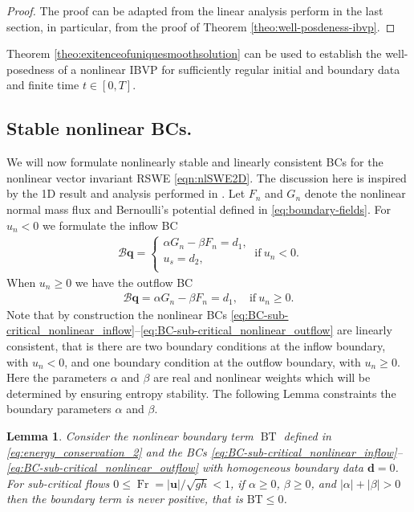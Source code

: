 \documentclass{article}
\numberwithin{equation}{section}
\newtheorem{lemma}{Lemma}
\theoremstyle{definition}
\begin{document}
\begin{proof}
    The proof can be adapted from the linear analysis  perform in the last section, in particular, from the proof of Theorem \ref{theo:well-posdeness-ibvp}.
\end{proof}
Theorem \ref{theo:exitenceofuniquesmoothsolution} can be used to establish the well-posedness of a nonlinear IBVP for sufficiently regular initial and boundary data and finite time $t \in [0, T]$.
\subsection{Stable nonlinear BCs.}
We will now formulate nonlinearly stable and linearly consistent BCs for the nonlinear vector invariant RSWE \eqref{eqn:nlSWE2D}. The discussion here is inspired by the 1D result and analysis performed in \cite{HEW2025113624}.
Let $F_n$  and  $G_n$ denote the nonlinear normal mass flux and Bernoulli's potential defined in \eqref{eq:boundary-fields}.
For $u_n< 0$ we formulate the inflow BC
\begin{eqnarray}\label{eq:BC-sub-critical_nonlinear_inflow}
\mathcal{B}\textbf{q}=
 \begin{cases}
     \alpha G_n - \beta F_n= d_1,   \\
    u_s = d_2,
   \\
    \end{cases}
    \ \text{if} \ u_n < 0.
    \end{eqnarray}
    When $u_n \ge 0$ we have the outflow BC
    \begin{eqnarray}\label{eq:BC-sub-critical_nonlinear_outflow}
\mathcal{B}\textbf{q}=
    \alpha G_n - \beta F_n= d_1,   \quad  \text{if} \ u_n \ge  0.
    \end{eqnarray}
Note that by construction the nonlinear BCs \eqref{eq:BC-sub-critical_nonlinear_inflow}--\eqref{eq:BC-sub-critical_nonlinear_outflow} are linearly consistent, that is there are two boundary conditions at the inflow boundary, with $u_n<0$, and one boundary condition at the outflow boundary, with $u_n\ge 0$.
Here the parameters $\alpha$ and $\beta$ are real and nonlinear weights which will be determined by ensuring entropy stability. The following Lemma constraints the boundary parameters $\alpha$ and $\beta$.
\begin{lemma}\label{Lem:BC-Sub-critical-nonlinear-flow}
    Consider the nonlinear boundary term $\operatorname{BT}$ defined in \eqref{eq:energy_conservation_2} and the BCs \eqref{eq:BC-sub-critical_nonlinear_inflow}--\eqref{eq:BC-sub-critical_nonlinear_outflow} with homogeneous boundary data $\mathbf{d} =0$. For sub-critical flows $ 0\le \operatorname{Fr} = |\mathbf{u}|/\sqrt{gh} < 1$, if  $\alpha\ge 0$, $\beta\ge0$, and $|\alpha| + |\beta| >0$  then the boundary term is never positive, that is $\mathrm{BT} \le 0$.
\end{lemma}
\end{document}
